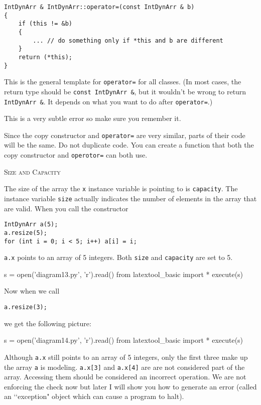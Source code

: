 \begin{Verbatim}[frame=single]
IntDynArr & IntDynArr::operator=(const IntDynArr & b) 
{
    if (this != &b)
    {
        ... // do something only if *this and b are different
    }
    return (*this);
}
\end{Verbatim}

This is the general template for \verb!operator=! for all
classes.
(In most cases, the return type should be
\verb!const IntDynArr &!, but it wouldn't be wrong
to return \verb!IntDynArr &!.
It depends on what you want to do after
\verb!operator=!.)

This is a very subtle error so make sure you remember it.

Since the copy constructor and \verb!operator=! are very similar, parts 
of their code will be the same. Do not duplicate code. You can create a 
function that both the copy constructor and
\verb!operotor=! can both use.



\newpage
\textsc{Size and Capacity}

The size of the array the \verb!x! instance variable is pointing 
to is \verb!capacity!. The instance variable \verb!size! actually 
indicates the number of elements in the array that are valid. When 
you call the constructor

\begin{Verbatim}[frame=single]
IntDynArr a(5);
a.resize(5);
for (int i = 0; i < 5; i++) a[i] = i;
\end{Verbatim}
\verb!a.x! points to an array of 5 integers.
Both \verb!size! and \verb!capacity! 
are set to 5.
\begin{python}
s = open('diagram13.py', 'r').read()
from latextool_basic import *
execute(s)
\end{python}

Now when we call
\begin{Verbatim}[frame=single]
a.resize(3);
\end{Verbatim}
we get the following picture:
\begin{python}
s = open('diagram14.py', 'r').read()
from latextool_basic import *
execute(s)
\end{python}

Although \verb!a.x! still points to an array of 5 integers, only 
the first three make up the array \verb!a! is modeling. \verb!a.x[3]!
and \verb!a.x[4]! are are not considered part of the array. Accessing 
them should be considered an incorrect operation. We are not enforcing 
the check now but later I will show you how to generate an error 
(called an \lq\lq exception" object which can cause a program to halt). 

